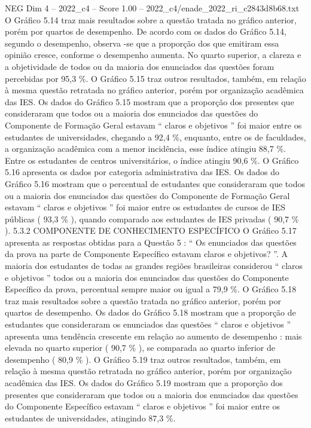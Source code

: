 \begin{textsample}{NEG Dim 4 – 2022\_c4 – Score 1.00 – 2022\_c4/enade\_2022\_ri\_c2843d8b68.txt}
O Gráfico 5.14 traz mais resultados sobre a questão tratada no gráfico anterior, porém por quartos de desempenho.
De acordo com os dados do Gráfico 5.14, segundo o desempenho, observa -se que a proporção dos que emitiram essa opinião cresce, conforme o desempenho aumenta.
No quarto superior, a clareza e a objetividade de todos ou da maioria dos enunciados das questões foram percebidas por 95,3 \%.
O Gráfico 5.15 traz outros resultados, também, em relação à mesma questão retratada no gráfico anterior, porém por organização acadêmica das IES.
Os dados do Gráfico 5.15 mostram que a proporção dos presentes que consideraram que todos ou a maioria dos enunciados das questões do Componente de Formação Geral estavam “ claros e objetivos ” foi maior entre os estudantes de universidades, chegando a 92,4 \%, enquanto, entre os de faculdades, a organização acadêmica com a menor incidência, esse índice atingiu 88,7 \%.
Entre os estudantes de centros universitários, o índice atingiu 90,6 \%.
O Gráfico 5.16 apresenta os dados por categoria administrativa das IES.
Os dados do Gráfico 5.16 mostram que o percentual de estudantes que consideraram que todos ou a maioria dos enunciados das questões do Componente de Formação Geral estavam “ claros e objetivos ” foi maior entre os estudantes de cursos de IES públicas ( 93,3 \% ), quando comparado aos estudantes de IES privadas ( 90,7 \% ). 5.3.2 COMPONENTE DE CONHECIMENTO ESPECÍFICO O Gráfico 5.17 apresenta as respostas obtidas para a Questão 5 : “ Os enunciados das questões da prova na parte de Componente Específico estavam claros e objetivos? ”.
A maioria dos estudantes de todas as grandes regiões brasileiras considerou “ claros e objetivos ” todos ou a maioria dos enunciados das questões do Componente Específico da prova, percentual sempre maior ou igual a 79,9 \%.
O Gráfico 5.18 traz mais resultados sobre a questão tratada no gráfico anterior, porém por quartos de desempenho.
Os dados do Gráfico 5.18 mostram que a proporção de estudantes que consideraram os enunciados das questões “ claros e objetivos ” apresenta uma tendência crescente em relação ao aumento de desempenho : mais elevada no quarto superior ( 90,7 \% ), se comparada ao quarto inferior de desempenho ( 80,9 \% ).
O Gráfico 5.19 traz outros resultados, também, em relação à mesma questão retratada no gráfico anterior, porém por organização acadêmica das IES.
Os dados do Gráfico 5.19 mostram que a proporção dos presentes que consideraram que todos ou a maioria dos enunciados das questões do Componente Específico estavam “ claros e objetivos ” foi maior entre os estudantes de universidades, atingindo 87,3 \%.

\end{textsample}
